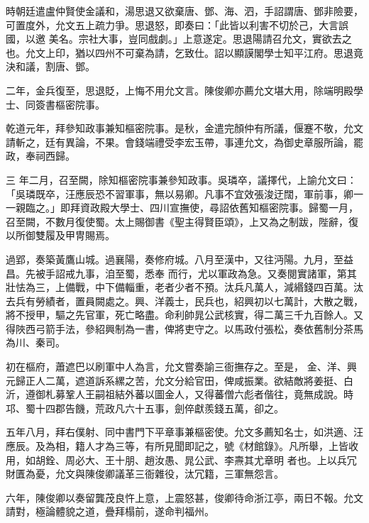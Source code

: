 \begin{pinyinscope}
 時朝廷遣盧仲賢使金議和，湯思退又欲棄唐、鄧、海、泗，手詔謂唐、鄧非險要，可置度外，允文五上疏力爭。思退怒，即奏曰：「此皆以利害不切於己，大言誤國，以邀
 美名。宗社大事，豈同戲劇。」上意遂定。思退陽請召允文，實欲去之也。允文上印，猶以四州不可棄為請，乞致仕。詔以顯謨閣學士知平江府。思退竟決和議，割唐、鄧。



 二年，金兵復至，思退貶，上悔不用允文言。陳俊卿亦薦允文堪大用，除端明殿學士、同簽書樞密院事。



 乾道元年，拜參知政事兼知樞密院事。是秋，金遣完顏仲有所議，偃蹇不敬，允文請斬之，廷有異論，不果。會錢端禮受李宏玉帶，事連允文，為御史章服所論，罷政，奉祠西歸。



 三
 年二月，召至闕，除知樞密院事兼參知政事。吳璘卒，議擇代，上諭允文曰：「吳璘既卒，汪應辰恐不習軍事，無以易卿。凡事不宜效張浚迂闊，軍前事，卿一一親臨之。」即拜資政殿大學士、四川宣撫使，尋詔依舊知樞密院事。歸蜀一月，召至闕，不數月復使蜀。太上賜御書《聖主得賢臣頌》，上又為之制跋，陛辭，復以所御雙履及甲冑賜焉。



 過郢，奏築黃鷹山城。過襄陽，奏修府城。八月至漢中，又往沔陽。九月，至益昌。先被手詔戒九事，洎至蜀，悉奉
 而行，尤以軍政為急。又奏閱實諸軍，第其壯怯為三，上備戰，中下備輜重，老者少者不預。汰兵凡萬人，減緡錢四百萬。汰去兵有勞績者，置員闕處之。興、洋義士，民兵也，紹興初以七萬計，大散之戰，將不授甲，驅之先官軍，死亡略盡。命利帥晁公武核實，得二萬三千九百餘人。又得陜西弓箭手法，參紹興制為一書，俾將吏守之。以馬政付張松，奏依舊制分茶馬為川、秦司。



 初在樞府，蕭遮巴以刷軍中人為言，允文嘗奏諭三衙撫存之。至是，
 金、洋、興元歸正人二萬，遮道訴系縲之苦，允文分給官田，俾咸振業。欲結敵將姜挺、白沂，遵御札募鞏人王嗣祖結外蕃以圖金人，又得蕃僧六彪者偕往，竟無成說。時邛、蜀十四郡告饑，荒政凡六十五事，劍倅獻羨錢五萬，卻之。



 五年八月，拜右僕射、同中書門下平章事兼樞密使。允文多薦知名士，如洪適、汪應辰。及為相，籍人才為三等，有所見聞即記之，號《材館錄》。凡所舉，上皆收用，如胡銓、周必大、王十朋、趙汝愚、晁公武、李燾其尤章明
 者也。上以兵冗財匱為憂，允文與陳俊卿議革三衙雜役，汰冗籍，三軍無怨言。



 六年，陳俊卿以奏留龔茂良忤上意，上震怒甚，俊卿待命浙江亭，兩日不報。允文請對，極論體貌之道，疊拜榻前，遂命判福州。




\end{pinyinscope}
